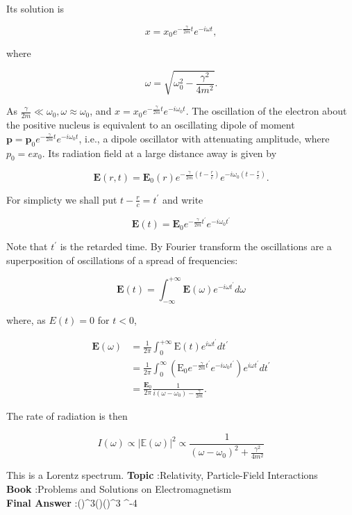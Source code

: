 \documentclass[10pt]{article}
\begin{document}
Its solution is

$$
x=x_{0} e^{-\frac{\gamma}{2 m} t} e^{-i \omega t},
$$

where

$$
\omega=\sqrt{\omega_{0}^{2}-\frac{\gamma^{2}}{4 m^{2}}} .
$$

As $\frac{\gamma}{2 m} \ll \omega_{0}, \omega \approx \omega_{0}$, and $x=x_{0} e^{-\frac{\gamma}{2 m} t} e^{-i \omega_{0} t}$. The oscillation of the electron about the positive nucleus is equivalent to an oscillating dipole of moment $\mathbf{p}=\mathbf{p}_{0} e^{-\frac{\gamma}{2 m} t} e^{-i \omega_{0} t}$, i.e., a dipole oscillator with attenuating amplitude, where $p_{0}=e x_{0}$. Its radiation field at a large distance away is given by

$$
\mathbf{E}(r, t)=\mathbf{E}_{0}(r) e^{-\frac{\gamma}{2 m}\left(t-\frac{r}{c}\right)} e^{-i \omega_{0}\left(t-\frac{r}{c}\right)} .
$$

For simplicty we shall put $t-\frac{r}{c}=t^{\prime}$ and write

$$
\mathbf{E}(t)=\mathbf{E}_{0} e^{-\frac{\gamma}{2 m} t^{\prime}} e^{-i \omega_{0} t^{\prime}}
$$

Note that $t^{\prime}$ is the retarded time. By Fourier transform the oscillations are a superposition of oscillations of a spread of frequencies:

$$
\mathbf{E}(t)=\int_{-\infty}^{+\infty} \mathbf{E}(\omega) e^{-i \omega t^{\prime}} d \omega
$$

where, as $E(t)=0$ for $t<0$,

$$
\begin{aligned}
\mathbf{E}(\omega) &=\frac{1}{2 \pi} \int_{0}^{+\infty} \mathrm{E}(t) e^{i \omega t^{\prime}} d t^{\prime} \\
&=\frac{1}{2 \pi} \int_{0}^{\infty}\left(\mathrm{E}_{0} e^{-\frac{\gamma}{2 m} t^{\prime}} e^{-i \omega_{0} t^{\prime}}\right) e^{i \omega t^{\prime}} d t^{\prime} \\
&=\frac{\mathbf{E}_{0}}{2 \pi} \frac{1}{i\left(\omega-\omega_{0}\right)-\frac{\gamma}{2 m}} .
\end{aligned}
$$

The rate of radiation is then

$$
I(\omega) \propto|\mathbb{E}(\omega)|^{2} \propto \frac{1}{\left(\omega-\omega_{0}\right)^{2}+\frac{\gamma^{2}}{4 m^{2}}}
$$

This is a Lorentz spectrum.
\textbf{Topic} :Relativity, Particle-Field Interactions\\
\textbf{Book} :Problems and Solutions on Electromagnetism\\
\textbf{Final Answer} :\left(\right)^{3}\left(\right)\left(\right)^{3}  ^{-4}\\
\end{document}
